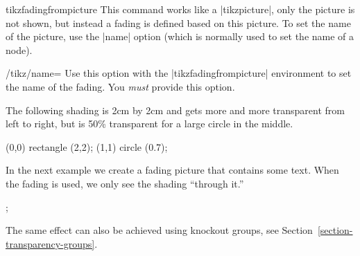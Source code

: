 \begin{environment}{{tikzfadingfrompicture}}
  This command works like a |{tikzpicture}|, only the picture is not
  shown, but instead a fading is defined based on this picture. To set
  the name of the picture, use the |name| option (which is normally
  used to set the name of a node).
  \begin{key}{/tikz/name=}
    Use this option with the |{tikzfadingfrompicture}| environment to
    set the name of the fading. You \emph{must} provide this option.
  \end{key}

  The following shading is 2cm by 2cm and gets more and more
  transparent from left to right, but is 50\% transparent for a large
  circle in the middle.
{\tikzexternaldisable
\begin{codeexample}[]
\begin{tikzfadingfrompicture}[name=fade right]
  \shade[left color=transparent!0,
         right color=transparent!100] (0,0) rectangle (2,2);
  \fill[transparent!50] (1,1) circle (0.7);
\end{tikzfadingfrompicture}

\end{codeexample}
  In the next example we create a fading picture that contains some
  text. When the fading is used, we only see the shading ``through
  it.''
\begin{codeexample}[]
\begin{tikzfadingfrompicture}[name=tikz]
  ;
\end{tikzfadingfrompicture}

\end{codeexample}
}%

  The same effect can also be achieved using knockout groups, see
  Section~\ref{section-transparency-groups}.
\end{environment}


